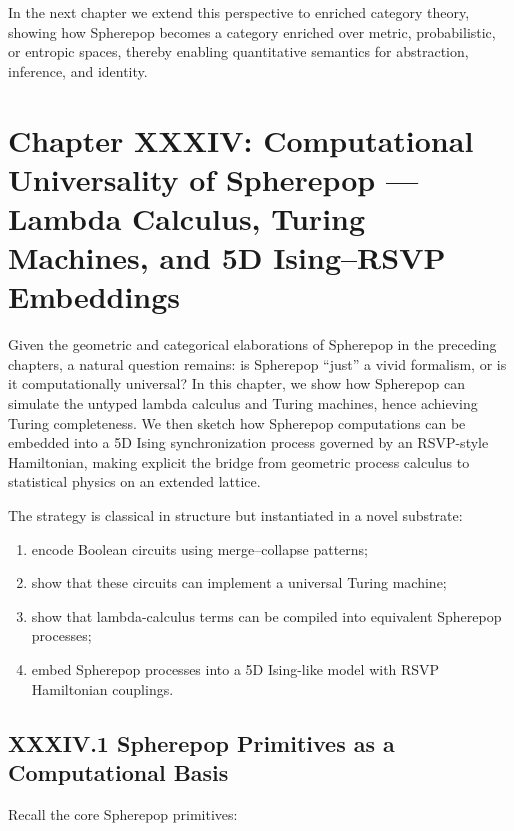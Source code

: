 \documentclass[11pt,letterpaper]{article}
\begin{document}
In the next chapter we extend this perspective to enriched category theory, showing how Spherepop becomes a category enriched over metric, probabilistic, or entropic spaces, thereby enabling quantitative semantics for abstraction, inference, and identity.
\newpage

\section{Chapter XXXIV: Computational Universality of Spherepop —  
Lambda Calculus, Turing Machines, and 5D Ising--RSVP Embeddings}

Given the geometric and categorical elaborations of Spherepop in the preceding chapters, a natural question remains: is Spherepop ``just'' a vivid formalism, or is it computationally universal? In this chapter, we show how Spherepop can simulate the untyped lambda calculus and Turing machines, hence achieving Turing completeness. We then sketch how Spherepop computations can be embedded into a 5D Ising synchronization process governed by an RSVP-style Hamiltonian, making explicit the bridge from geometric process calculus to statistical physics on an extended lattice.

The strategy is classical in structure but instantiated in a novel substrate:

\begin{enumerate}
  \item encode Boolean circuits using merge--collapse patterns;
  \item show that these circuits can implement a universal Turing machine;
  \item show that lambda-calculus terms can be compiled into equivalent Spherepop processes;
  \item embed Spherepop processes into a 5D Ising-like model with RSVP Hamiltonian couplings.
\end{enumerate}

\subsection{XXXIV.1 Spherepop Primitives as a Computational Basis}

Recall the core Spherepop primitives:
\end{document}
